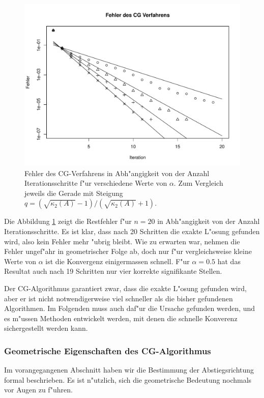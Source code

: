 \begin{beispiel}
\begin{figure}
\begin{center}
\includegraphics[width=\hsize]{graphics/cgresults.pdf}
\end{center}
\caption{Fehler des CG-Verfahrens in Abh"angigkeit von der Anzahl
Iterationsschritte f"ur verschiedene Werte von $\alpha$.
Zum Vergleich jeweils die Gerade mit Steigung
$q=(\sqrt{\kappa_2(A)}-1)/(\sqrt{\kappa_2(A)}+1)$.
\label{cg:example}}
\end{figure}
Die Abbildung \ref{cg:example} zeigt die Restfehler f"ur $n=20$
in Abh"angigkeit von der Anzahl Iterationsschritte.
Es ist klar, dass nach 20 Schritten die exakte L"osung gefunden wird, also
kein Fehler mehr "ubrig bleibt.
Wie zu erwarten war, nehmen die Fehler ungef"ahr in geometrischer Folge ab,
doch nur f"ur vergleichsweise kleine Werte von $\alpha$ ist die Konvergenz
einigermassen schnell.
F"ur $\alpha = 0.5$ hat das Resultat auch nach 19 Schritten nur vier
korrekte signifikante Stellen.
\end{beispiel}

Der CG-Algorithmus garantiert zwar, dass die exakte L"osung gefunden
wird, aber er ist nicht notwendigerweise viel schneller als die bisher
gefundenen Algorithmen.
Im Folgenden muss auch daf"ur die Ursache gefunden werden, und es m"ussen
Methoden entwickelt werden, mit denen die schnelle Konverenz sichergestellt
werden kann.

\subsubsection{Geometrische Eigenschaften des CG-Algorithmus}
Im vorangegangenen Abschnitt haben wir die Bestimmung der Abstiegsrichtung
formal beschrieben.
Es ist n"utzlich, sich die geometrische Bedeutung nochmals
vor Augen zu f"uhren. 

